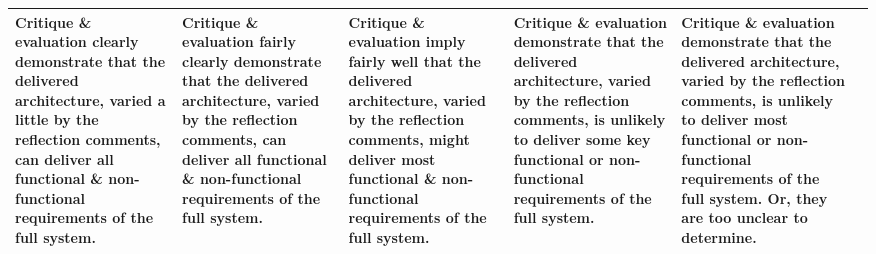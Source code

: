 \begin{landscape}
\begin{xltabular}{\linewidth}{| p{1.8cm} | X | X | X | X | X |}
Critique \& evaluation clearly demonstrate that the delivered architecture, varied a little by the reflection comments, can deliver all functional \& non-functional requirements of the full system. &
Critique \& evaluation fairly clearly demonstrate that the delivered architecture, varied by the reflection comments, can deliver all functional \& non-functional requirements of the full system. &
Critique \& evaluation imply fairly well that the delivered architecture, varied by the reflection comments, might deliver most functional \& non-functional requirements of the full system. &
Critique \& evaluation demonstrate that the delivered architecture, varied by the reflection comments, is unlikely to deliver some key functional or non-functional requirements of the full system. &
Critique \& evaluation demonstrate that the delivered architecture, varied by the reflection comments, is unlikely to deliver most functional or non-functional requirements of the full system. Or, they are too unclear to determine. \\
\hline
\end{xltabular}

\clearpage
\end{landscape}